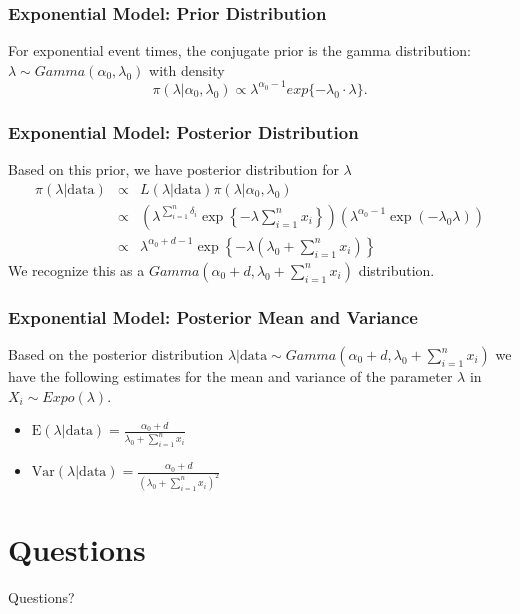 \documentclass{beamer}
\begin{document}
\begin{frame}
\frametitle{Exponential Model: Prior Distribution}
For exponential event times, the conjugate prior is the gamma distribution: $\lambda \sim Gamma(\alpha_0, \lambda_0)$ with density
$$\pi(\lambda|\alpha_0,\lambda_0) \propto \lambda^{\alpha_0-1}exp\{-\lambda_0 \cdot \lambda\}.$$
\end{frame}

\begin{frame}
\frametitle{Exponential Model: Posterior Distribution}
Based on this prior, we have posterior distribution for $\lambda$
\begin{eqnarray*}
\pi(\lambda|\text{data}) &\propto& L(\lambda|\text{data}) \pi(\lambda|\alpha_0,\lambda_0) \\
&\propto& \left(\lambda^{\sum_{i=1}^n \delta_i} \exp\left\{-\lambda \sum_{i=1}^n x_i \right\} \right) \left(\lambda^{\alpha_0-1}\exp(-\lambda_0\lambda) \right) \\
&\propto& \lambda^{\alpha_0+d - 1}\exp\left\{-\lambda(\lambda_0 + \sum_{i=1}^n x_i ) \right\}
\end{eqnarray*}
We recognize this as a \color{orange}$Gamma(\alpha_0 + d, \lambda_0 + \sum_{i=1}^{n}x_i)$ \color{black}distribution. 
\end{frame}

\begin{frame}
\frametitle{Exponential Model: Posterior Mean and Variance}
Based on the posterior distribution $\lambda|\text{data} \sim Gamma(\alpha_0 + d, \lambda_0 + \sum_{i=1}^{n}x_i)$ we have the following estimates for the mean and variance of the parameter $\lambda$ in $X_i \sim Expo(\lambda)$.
\begin{itemize}
\item $\text{E}(\lambda|\text{data}) = \frac{\alpha_0 + d}{\lambda_0 + \sum_{i=1}^n x_i}$
\item $\text{Var}(\lambda|\text{data}) = \frac{\alpha_0 + d}{(\lambda_0 + \sum_{i=1}^n x_i)^2}$
\end{itemize} 
\end{frame}

\section{Questions}
\begin{frame}[c]
\begin{center}
\Huge
Questions? 
\end{center}
\end{frame}
\end{document}
